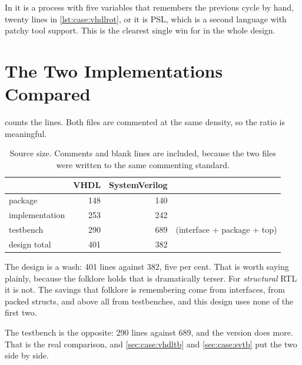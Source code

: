 In \VHDL{} it is a process with five variables that remembers the previous
cycle by hand, twenty lines in \cref{lst:case:vhdlrot}, or it is PSL, which
is a second language with patchy tool support. This is the clearest single
win for \SV{} in the whole design.

\clearpage
{}

\clearpage
{}

\clearpage
\section{The Two Implementations Compared}
\label{sec:case:compare}

 counts the lines. Both files are commented at the same
density, so the ratio is meaningful.

\begin{table}[htbp]
  \centering
  \small
  \caption{Source size. Comments and blank lines are included, because the
  two files were written to the same commenting standard.}
  \label{tab:case:lines}
  \begin{tabular}{@{}lrrl@{}}
    \toprule
    & VHDL & SystemVerilog & \\
    \midrule
    package        & 148 & 140 & \\
    implementation & 253 & 242 & \\
    testbench      & 290 & 689 & (interface + package + top)\\
    \midrule
    design total   & 401 & 382 & \\
    \bottomrule
  \end{tabular}
\end{table}

The design is a wash: 401 lines against 382, five per cent. That is worth
saying plainly, because the folklore holds that \SV{} is dramatically
terser. For \emph{structural} RTL it is not. The savings that folklore is
remembering come from interfaces, from packed structs, and above all from
testbenches, and this design uses none of the first two.

The testbench is the opposite: 290 lines against 689, and the \SV{} version
does more. That is the real comparison, and \cref{sec:case:vhdltb} and
\cref{sec:case:svtb} put the two side by side.

